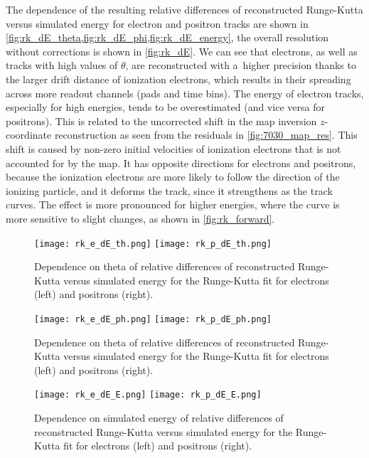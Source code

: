 			The dependence of the resulting relative differences of reconstructed Runge-Kutta versus simulated energy for electron and positron tracks are shown in \cref{fig:rk_dE_theta,fig:rk_dE_phi,fig:rk_dE_energy}, the overall resolution without corrections is shown in \cref{fig:rk_dE}. We can see that electrons, as well as tracks with high values of $\theta$, are reconstructed with a~higher precision thanks to the larger drift distance of ionization electrons, which results in their spreading across more readout channels (pads and time bins). The energy of electron tracks, especially for high energies, tends to be overestimated (and vice versa for positrons). This is related to the uncorrected shift in the map inversion $z$\nobreakdash-coordinate reconstruction as seen from the residuals in \cref{fig:7030_map_res}. This shift is caused by non-zero initial velocities of ionization electrons that is not accounted for by the map. It has opposite directions for electrons and positrons, because the ionization electrons are more likely to follow the direction of the ionizing particle, and it deforms the track, since it strengthens as the track curves. The effect is more pronounced for higher energies, where the curve is more sensitive to slight changes, as shown in \cref{fig:rk_forward}.

			\begin{figure}
				\centering
				\texttt{[image: rk\_e\_dE\_th.png]}
				\hfill
				\texttt{[image: rk\_p\_dE\_th.png]}
				\caption{Dependence on theta of relative differences of reconstructed Runge-Kutta versus simulated energy for the Runge-Kutta fit for electrons (left) and positrons (right).}
				\label{fig:rk_dE_theta}
			\end{figure}


			\begin{figure}
				\centering
				\texttt{[image: rk\_e\_dE\_ph.png]}
				\hfill
				\texttt{[image: rk\_p\_dE\_ph.png]}
				\caption{Dependence on theta of relative differences of reconstructed Runge-Kutta versus simulated energy for the Runge-Kutta fit for electrons (left) and positrons (right).}
				\label{fig:rk_dE_phi}
			\end{figure}

			\begin{figure}
				\centering
				\texttt{[image: rk\_e\_dE\_E.png]}
				\hfill
				\texttt{[image: rk\_p\_dE\_E.png]}
				\caption{Dependence on simulated energy of relative differences of reconstructed Runge-Kutta versus simulated energy for the Runge-Kutta fit for electrons (left) and positrons (right).}
				\label{fig:rk_dE_energy}
			\end{figure}

